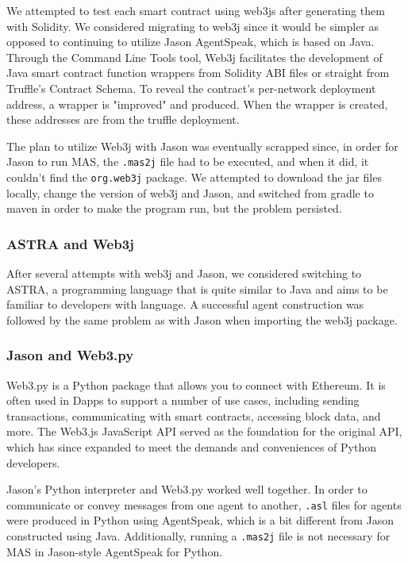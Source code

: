 We attempted to test each smart contract using web3js after generating them with Solidity. We considered migrating to web3j since it would be simpler as opposed to continuing to utilize Jason AgentSpeak, which is based on Java. Through the Command Line Tools tool, Web3j facilitates the development of Java smart contract function wrappers from Solidity ABI files or straight from Truffle's Contract Schema. To reveal the contract's per-network deployment address, a wrapper is "improved" and produced. When the wrapper is created, these addresses are from the truffle deployment.

\vspace{.5cm}

The plan to utilize Web3j with Jason was eventually scrapped since, in order for Jason to run \ac{MAS}, the \texttt{.mas2j} file had to be executed, and when it did, it couldn't find the \texttt{org.web3j} package. We attempted to download the jar files locally, change the version of web3j and Jason, and switched from gradle to maven in order to make the program run, but the problem persisted.

\subsubsection{ASTRA and Web3j}

After several attempts with web3j and Jason, we considered switching to ASTRA, a programming language that is quite similar to Java and aims to be familiar to developers with language. A successful agent construction was followed by the same problem as with Jason when importing the web3j package.

\subsubsection{Jason and Web3.py}

Web3.py is a Python package that allows you to connect with Ethereum. It is often used in \ac{Dapp}s to support a number of use cases, including sending transactions, communicating with smart contracts, accessing block data, and more. The Web3.js JavaScript \ac{API} served as the foundation for the original \ac{API}, which has since expanded to meet the demands and conveniences of Python developers.

\vspace{.5cm}

Jason's Python interpreter and Web3.py worked well together. In order to communicate or convey messages from one agent to another, \texttt{.asl} files for agents were produced in Python using AgentSpeak, which is a bit different from Jason constructed using Java. Additionally, running a \texttt{.mas2j} file is not necessary for \ac{MAS} in Jason-style AgentSpeak for Python.

